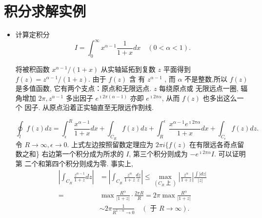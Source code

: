 \section{积分求解实例}

\begin{itemize}
    \item 计算定积分 
    $$
    I=\int_0^{\infty} x^{\alpha-1} \frac{1}{1+x} d x \quad(0<\alpha<1).
    $$

    将被积函数 $x^{\alpha-1} /(1+x)$ 从实轴延拓到复数 $z$ 平面得到 
    $f(z)=z^{\alpha-1} /(1+z)$. 由于 $f(z)$ 含 有 $z^{\alpha-1}$ ,
    而 $\alpha$ 不是整数,所以 $f(z)$ 是多值函数, 它有两个支点：原点和无限远点. 
    $z$ 每绕原点或 无限远点一圈, 辐角增加 $2 \pi, z^{\alpha-1}$ 多出因子 
    $e^{\imath 2 \pi(\alpha-1)}$ 亦即 $e^{\imath 2 \pi \alpha}$,
     从而 $f(z)$ 也多出这么一个 因子.
    从原点沿着正实轴直至无限远作割线.   
    
    $$
\oint_l f(z) d z=\int_{\epsilon}^R \frac{x^{\alpha-1}}{1+x} d x+\int_{C_R} f(z) d z+\int_R^{\epsilon} \frac{x^{\alpha-1} e^{\imath 2 \pi \alpha}}{1+x} d x+\int_{C_{\epsilon}} f(z) d z .
$$
令 $R \rightarrow \infty, \epsilon \rightarrow 0$.
 上式左边按照留数定理应为 $2 \pi i\{f(z)$ 在有限远各奇点留数之和\}
  右边第一个积分成为所求的 $I$, 第三个积分则成为 $-e^{\imath 2 \pi \alpha} I$. 
  可以证明第 二个和第四个积分则成为零. 事实上,
  $$
\begin{aligned}
\left|\int_{C_R} \frac{z^{\alpha-1}}{1+z} d z\right| & =\left|\int_{C_R} \frac{z^\alpha}{1+z} \frac{d z}{z}\right| \leqslant \max _{\left(C_R \text { 上 }\right)}\left|\frac{z^\alpha}{1+z}\right| \frac{\int|d z|}{|z|} \\
= & \max \frac{R^\alpha}{|1+z|} \cdot \frac{2 \pi R}{R}=2 \pi \max \frac{R^\alpha}{|1+z|} \\
& \sim 2 \pi \frac{1}{R^{1-\alpha} \rightarrow 0} \quad(\text { 于 } R \rightarrow \infty) .
\end{aligned}
$$


\end{itemize}
